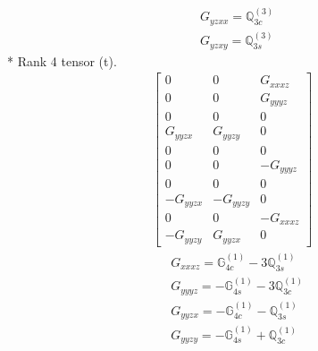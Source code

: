 \documentclass[fleqn,8pt,landscape]{jsarticle}
\begin{document}
\begin{align*}
& G_{yzxx} = \mathbb{Q}_{3c}^{(3)} \\
& G_{yzxy} = \mathbb{Q}_{3s}^{(3)}
\end{align*}
* Rank 4 tensor (t).
\begin{align*}
\begin{bmatrix} 0 & 0 & G_{xxxz} \\ 0 & 0 & G_{yyyz} \\ 0 & 0 & 0 \\ G_{yyzx} & G_{yyzy} & 0 \\ 0 & 0 & 0 \\ 0 & 0 & - G_{yyyz} \\ 0 & 0 & 0 \\ - G_{yyzx} & - G_{yyzy} & 0 \\ 0 & 0 & - G_{xxxz} \\ - G_{yyzy} & G_{yyzx} & 0 \end{bmatrix}
\end{align*}
\begin{align*}
& G_{xxxz} = \mathbb{G}_{4c}^{(1)} - 3 \mathbb{Q}_{3s}^{(1)} \\
& G_{yyyz} = - \mathbb{G}_{4s}^{(1)} - 3 \mathbb{Q}_{3c}^{(1)} \\
& G_{yyzx} = - \mathbb{G}_{4c}^{(1)} - \mathbb{Q}_{3s}^{(1)} \\
& G_{yyzy} = - \mathbb{G}_{4s}^{(1)} + \mathbb{Q}_{3c}^{(1)}
\end{align*}
\end{document}
